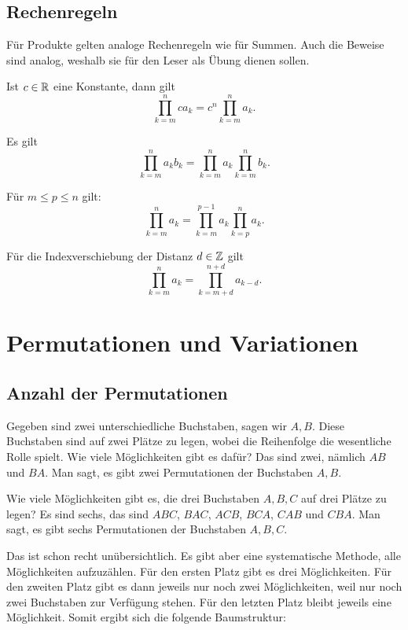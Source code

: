 \subsection{Rechenregeln}
Für Produkte gelten analoge Rechenregeln wie für Summen. Auch
die Beweise sind analog, weshalb sie für den Leser als Übung
dienen sollen.%
\begin{Satz}
Ist $c\in\mathbb R$ eine Konstante, dann gilt%
\[\prod_{k=m}^n ca_k = c^n\prod_{k=m}^n a_k.\]
\end{Satz}
\begin{Satz}
Es gilt
\[\prod_{k=m}^n a_k b_k = \prod_{k=m}^n a_k \prod_{k=m}^n b_k.\]
\end{Satz}
\begin{Satz}\label{Prod-Aufteilung}
Für $m\le p\le n$ gilt:
\[\prod_{k=m}^n a_k = \prod_{k=m}^{p-1} a_k\prod_{k=p}^n a_k.\]
\end{Satz}
\begin{Satz}[Indexshift]\label{Prod-Indexshift}
Für die Indexverschiebung der Distanz $d\in\mathbb Z$ gilt%
\[\prod_{k=m}^n a_k = \prod_{k=m+d}^{n+d} a_{k-d}.\]
\end{Satz}

\newpage
\section{Permutationen und Variationen}%

\subsection{Anzahl der Permutationen}

Gegeben sind zwei unterschiedliche Buchstaben, sagen wir $A,B$. Diese
Buchstaben sind auf zwei Plätze zu legen, wobei die Reihenfolge die
wesentliche Rolle spielt. Wie viele Möglichkeiten gibt es dafür?
Das sind zwei, nämlich $AB$ und $BA$. Man sagt, es gibt zwei
Permutationen der Buchstaben $A,B$.

Wie viele Möglichkeiten gibt es, die drei Buchstaben $A,B,C$ auf
drei Plätze zu legen? Es sind sechs, das sind
$ABC$, $BAC$, $ACB$, $BCA$, $CAB$ und $CBA$. Man sagt, es gibt
sechs Permutationen der Buchstaben $A,B,C$.

Das ist schon recht unübersichtlich. Es gibt aber eine systematische
Methode, alle Möglichkeiten aufzuzählen. Für den ersten Platz gibt
es drei Möglichkeiten. Für den zweiten Platz gibt es dann jeweils
nur noch zwei Möglichkeiten, weil nur noch zwei Buchstaben zur
Verfügung stehen. Für den letzten Platz bleibt jeweils eine
Möglichkeit. Somit ergibt sich die folgende Baumstruktur:

